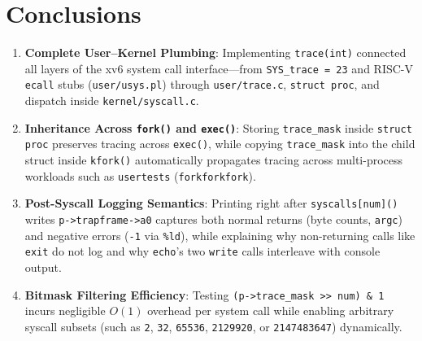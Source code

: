 \documentclass[12pt,a4paper]{article}
\begin{document}
\section{Conclusions}

\begin{enumerate}
    \item \textbf{Complete User--Kernel Plumbing}: Implementing \texttt{trace(int)} connected all layers of the xv6 system call interface---from \texttt{SYS\_trace = 23} and RISC-V \texttt{ecall} stubs (\texttt{user/usys.pl}) through \texttt{user/trace.c}, \texttt{struct proc}, and dispatch inside \texttt{kernel/syscall.c}.
    \item \textbf{Inheritance Across \texttt{fork()} and \texttt{exec()}}: Storing \texttt{trace\_mask} inside \texttt{struct proc} preserves tracing across \texttt{exec()}, while copying \texttt{trace\_mask} into the child struct inside \texttt{kfork()} automatically propagates tracing across multi-process workloads such as \texttt{usertests} (\texttt{forkforkfork}).
    \item \textbf{Post-Syscall Logging Semantics}: Printing right after \texttt{syscalls[num]()} writes \texttt{p->trapframe->a0} captures both normal returns (byte counts, \texttt{argc}) and negative errors (\texttt{-1} via \texttt{\%ld}), while explaining why non-returning calls like \texttt{exit} do not log and why \texttt{echo}'s two \texttt{write} calls interleave with console output.
    \item \textbf{Bitmask Filtering Efficiency}: Testing \texttt{(p->trace\_mask >{}> num) \& 1} incurs negligible $O(1)$ overhead per system call while enabling arbitrary syscall subsets (such as \texttt{2}, \texttt{32}, \texttt{65536}, \texttt{2129920}, or \texttt{2147483647}) dynamically.
\end{enumerate}
\end{document}

